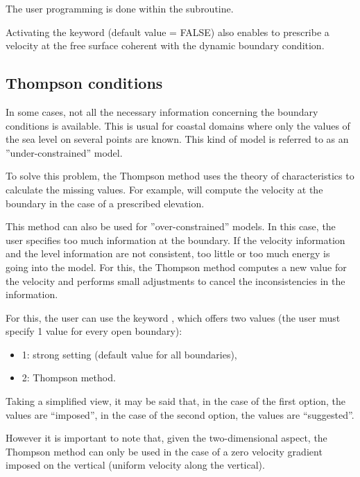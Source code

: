 The user programming is done within the  subroutine.

Activating the keyword  (default value =
FALSE) also enables to prescribe a velocity at the free surface coherent with
the dynamic boundary condition.

\subsection{Thompson conditions}

In some cases, not all the necessary information concerning the boundary
conditions is available.
This is usual for coastal domains where only the values of the sea level
on several points are known.
This kind of model is referred to as an ''under-constrained'' model.

To solve this problem, the Thompson method uses the theory of characteristics
to calculate the missing values.
For example,  will compute the velocity at the boundary in the case
of a prescribed elevation.

This method can also be used for ''over-constrained'' models. In this case,
the user specifies too much information at the boundary. If the velocity
information and the level information are not consistent, too little or too
much energy is going into the model. For this, the Thompson method computes a
new value for the velocity and performs small adjustments to cancel the
inconsistencies in the information.

For this, the user can use the keyword ,
which offers two values (the user must specify 1 value for every open
boundary):

\begin{itemize}
\item 1: strong setting (default value for all boundaries),

\item 2: Thompson method.
\end{itemize}

Taking a simplified view, it may be said that, in the case of the first
option, the values are ``imposed'', in the case of the second option, the
values are ``suggested''.

However it is important to note that, given the two-dimensional aspect, the
Thompson method can only be used in the case of a zero velocity gradient
imposed on the vertical (uniform velocity along the vertical).

